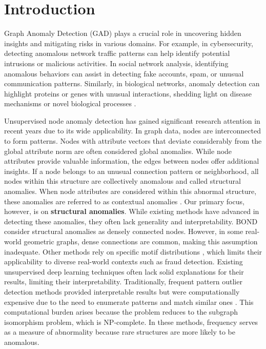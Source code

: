 \documentclass[pdflatex,sn-mathphys-num]{sn-jnl}%
\theoremstyle{thmstyleone}%
\theoremstyle{thmstyletwo}%
\theoremstyle{thmstylethree}%
\begin{document}
\section{Introduction}
Graph Anomaly Detection (GAD) plays a crucial role in uncovering hidden insights and mitigating risks in various domains. For example, in cybersecurity, detecting anomalous network traffic patterns can help identify potential intrusions or malicious activities. In social network analysis, identifying anomalous behaviors can assist in detecting fake accounts, spam, or unusual communication patterns. Similarly, in biological networks, anomaly detection can highlight proteins or genes with unusual interactions, shedding light on disease mechanisms or novel biological processes \cite{akoglu2015graph,Ma_2023,Ruff_2021}.

Unsupervised node anomaly detection has gained significant research attention in recent years due to its wide applicability. In graph data, nodes are interconnected to form patterns. Nodes with attribute vectors that deviate considerably from the global attribute norm are often considered global anomalies. While node attributes provide valuable information, the edges between nodes offer additional insights. If a node belongs to an unusual connection pattern or neighborhood, all nodes within this structure are collectively anomalous and called structural anomalies. When node attributes are considered within this abnormal structure, these anomalies are referred to as contextual anomalies \cite{NEURIPS2022-acc1ec4a,Ma_2023}. Our primary focus, however, is on \textbf{structural anomalies}. While existing methods have advanced in detecting these anomalies, they often lack generality and interpretability. BOND \cite{NEURIPS2022-acc1ec4a} consider structural anomalies as densely connected nodes. However, in some real-world geometric graphs, dense connections are common, making this assumption inadequate. Other methods rely on specific motif distributions \cite{bandyopadhyay2020outlier,xu2022contrastive,yuan2024higherorder}, which limits their applicability to diverse real-world contexts such as fraud detection. Existing unsupervised deep learning techniques often lack solid explanations for their results, limiting their interpretability. Traditionally, frequent pattern outlier detection methods provided interpretable results but were computationally expensive due to the need to enumerate patterns and match similar ones \cite{bressan2021faster,he2004frequent,yan2002gspan}. This computational burden arises because the problem reduces to the subgraph isomorphism problem, which is NP-complete. In these methods, frequency serves as a measure of abnormality because rare structures are more likely to be anomalous.
\end{document}
